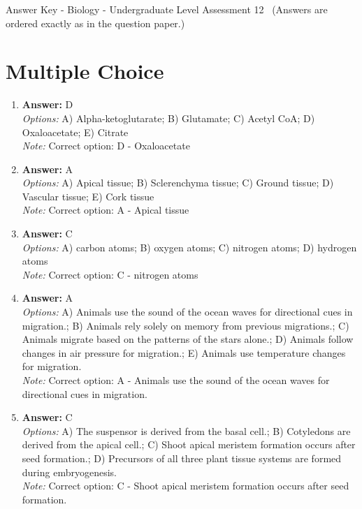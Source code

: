 \documentclass[12pt]{article}
\begin{document}
\begin{center}
Answer Key - Biology - Undergraduate Level Assessment 12 \
\small (Answers are ordered exactly as in the question paper.)
\end{center}

\section*{Multiple Choice}
\begin{enumerate}[label=\arabic*.]
\item \textbf{Answer:} D
\\ \textit{Options:} A) Alpha-ketoglutarate; B) Glutamate; C) Acetyl CoA; D) Oxaloacetate; E) Citrate
\\ \textit{Note:} Correct option: D - Oxaloacetate
\item \textbf{Answer:} A
\\ \textit{Options:} A) Apical tissue; B) Sclerenchyma tissue; C) Ground tissue; D) Vascular tissue; E) Cork tissue
\\ \textit{Note:} Correct option: A - Apical tissue
\item \textbf{Answer:} C
\\ \textit{Options:} A) carbon atoms; B) oxygen atoms; C) nitrogen atoms; D) hydrogen atoms
\\ \textit{Note:} Correct option: C - nitrogen atoms
\item \textbf{Answer:} A
\\ \textit{Options:} A) Animals use the sound of the ocean waves for directional cues in migration.; B) Animals rely solely on memory from previous migrations.; C) Animals migrate based on the patterns of the stars alone.; D) Animals follow changes in air pressure for migration.; E) Animals use temperature changes for migration.
\\ \textit{Note:} Correct option: A - Animals use the sound of the ocean waves for directional cues in migration.
\item \textbf{Answer:} C
\\ \textit{Options:} A) The suspensor is derived from the basal cell.; B) Cotyledons are derived from the apical cell.; C) Shoot apical meristem formation occurs after seed formation.; D) Precursors of all three plant tissue systems are formed during embryogenesis.
\\ \textit{Note:} Correct option: C - Shoot apical meristem formation occurs after seed formation.
\end{enumerate}
\end{document}
